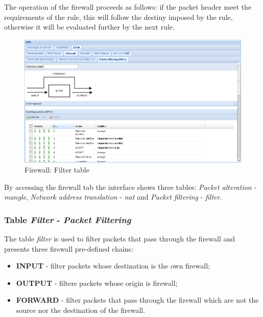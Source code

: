 The operation of the firewall proceeds as follows: if the packet header meet the requirements of the rule, this will follow the destiny imposed by the rule, otherwise it will be evaluated further by the next rule.

\begin{figure}[H]
    \begin{center}
    \includegraphics[scale=0.38]{screenshots/etfw/etfw_firewall_01.png}
    \caption{Firewall: Filter table}
    \label{fig:etfw_firewall_01}
    \end{center}
\end{figure}

By accessing the firewall tab the interface shows three tables: \textit{Packet alteration} - \textit{mangle}, \textit{Network address translation} - \textit{nat} and \textit{Packet filtering} - \textit{filter}.

\subsubsection{Table \textit{Filter} - \textit{Packet Filtering}}
The table \textit{filter} is used to filter packets that pass through the firewall and presents three firewall pre-defined chains:

\begin {itemize}
   \item \textbf{INPUT} - filter packets whose destination is the own firewall;
   \item \textbf{OUTPUT} - filters packets whose origin is firewall;
   \item \textbf{FORWARD} - filter packets that pass through the firewall which are not the source nor the destination of the firewall.
\end {itemize}

